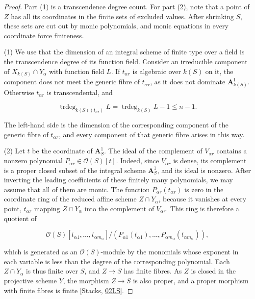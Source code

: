 \documentclass[11pt]{article}
\begin{document}
\begin{proof}[{Proof}]\label{bp42}%
Part (1) is a transcendence degree count. For part (2), note that a point of \(Z\) has all its coordinates in the finite sets of excluded values. After shrinking \(S\), these sets are cut out by monic polynomials, and monic equations in every coordinate force finiteness.

(1) We use that the dimension of an integral scheme of finite type over a field is the transcendence degree of its function field. Consider an irreducible component of \(X_{k(S)}\cap Y_\alpha\) with function field \(L\). If \(t_{\alpha r}\) is algebraic over \(k(S)\) on it, the component does not meet the generic fibre of \(t_{\alpha r}\), as it does not dominate \(\mathbf A^1_{k(S)}\). Otherwise \(t_{\alpha r}\) is transcendental, and

\[
\operatorname{trdeg}_{k(S)(t_{\alpha r})}L
=\operatorname{trdeg}_{k(S)} L-1\leq n-1.
\]

The left-hand side is the dimension of the corresponding component of the generic fibre of \(t_{\alpha r}\), and every component of that generic fibre arises in this way.

(2) Let \(t\) be the coordinate of \(\mathbf A^1_S\). The ideal of the complement of \(V_{\alpha r}\) contains a nonzero polynomial \(P_{\alpha r}\in\mathcal O(S)[t]\). Indeed, since \(V_{\alpha r}\) is dense, its complement is a proper closed subset of the integral scheme \(\mathbf A^1_S\), and its ideal is nonzero. After inverting the leading coefficients of these finitely many polynomials, we may assume that all of them are monic. The function \(P_{\alpha r}(t_{\alpha r})\) is zero in the coordinate ring of the reduced affine scheme \(Z\cap Y_\alpha\), because it vanishes at every point, \(t_{\alpha r}\) mapping \(Z\cap Y_\alpha\) into the complement of \(V_{\alpha r}\). This ring is therefore a quotient of

\[
\mathcal O(S)[t_{\alpha1},\ldots,t_{\alpha m_\alpha}]/
(P_{\alpha1}(t_{\alpha1}),\ldots,
P_{\alpha m_\alpha}(t_{\alpha m_\alpha})),
\]

which is generated as an \(\mathcal O(S)\)-module by the monomials whose exponent in each variable is less than the degree of the corresponding polynomial. Each \(Z\cap Y_\alpha\) is thus finite over \(S\), and \(Z\to S\) has finite fibres. As \(Z\) is closed in the projective scheme \(Y\), the morphism \(Z\to S\) is also proper, and a proper morphism with finite fibres is finite [Stacks, \href{https://stacks.math.columbia.edu/tag/02LS}{02LS}].
\end{proof}
\end{document}
